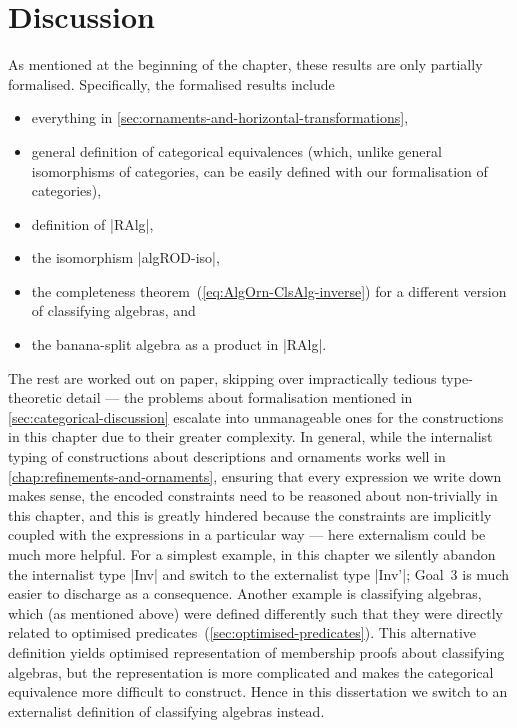 \section{Discussion}
\label{sec:equivalence-discussion}

As mentioned at the beginning of the chapter, these results are only partially formalised.
Specifically, the formalised results include
\begin{itemize}
\item everything in \autoref{sec:ornaments-and-horizontal-transformations},
\item general definition of categorical equivalences (which, unlike general isomorphisms of categories, can be easily defined with our formalisation of categories),
\item definition of |RAlg|,
\item the isomorphism |algROD-iso|,
\item the completeness theorem~(\ref{eq:AlgOrn-ClsAlg-inverse}) for a different version of classifying algebras, and
\item the banana-split algebra as a product in |RAlg|.
\end{itemize}
The rest are worked out on paper, skipping over impractically tedious type-theoretic detail --- the problems about formalisation mentioned in \autoref{sec:categorical-discussion} escalate into unmanageable ones for the constructions in this chapter due to their greater complexity.
In general, while the internalist typing of constructions about descriptions and ornaments works well in \autoref{chap:refinements-and-ornaments}, ensuring that every expression we write down makes sense, the encoded constraints need to be reasoned about non-trivially in this chapter, and this is greatly hindered because the constraints are implicitly coupled with the expressions in a particular way --- here externalism could be much more helpful.
For a simplest example, in this chapter we silently abandon the internalist type |Inv| and switch to the externalist type |Inv'|; Goal~3 is much easier to discharge as a consequence.
Another example is classifying algebras, which (as mentioned above) were defined differently such that they were directly related to optimised predicates~(\autoref{sec:optimised-predicates}).
This alternative definition yields optimised representation of membership proofs about classifying algebras, but the representation is more complicated and makes the categorical equivalence more difficult to construct.
Hence in this dissertation we switch to an externalist definition of classifying algebras instead.

